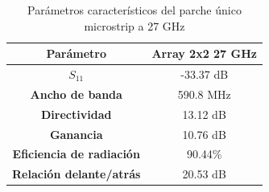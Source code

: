 \begin{table}[H]
  
  
   \small %
   \centering %
   \begin{tabular}{c c} %
   \toprule[\heavyrulewidth]\toprule[\heavyrulewidth]
   \textbf{Parámetro} & \textbf{Array 2x2 27 GHz} \\ 
   \midrule
   \textbf{$S_{11}$} & -33.37 dB \\
   \textbf{Ancho de banda} & 590.8 MHz \\
   \textbf{Directividad} & 13.12 dB \\
   \textbf{Ganancia} & 10.76 dB \\
   \textbf{Eficiencia de radiación} & 90.44\% \\
   \textbf{Relación delante/atrás} & 20.53 dB \\

   \bottomrule[\heavyrulewidth] 
   \end{tabular}
   \caption{Parámetros característicos del parche único microstrip a 27 GHz} 
    \label{tab:res2x23}
\end{table}

